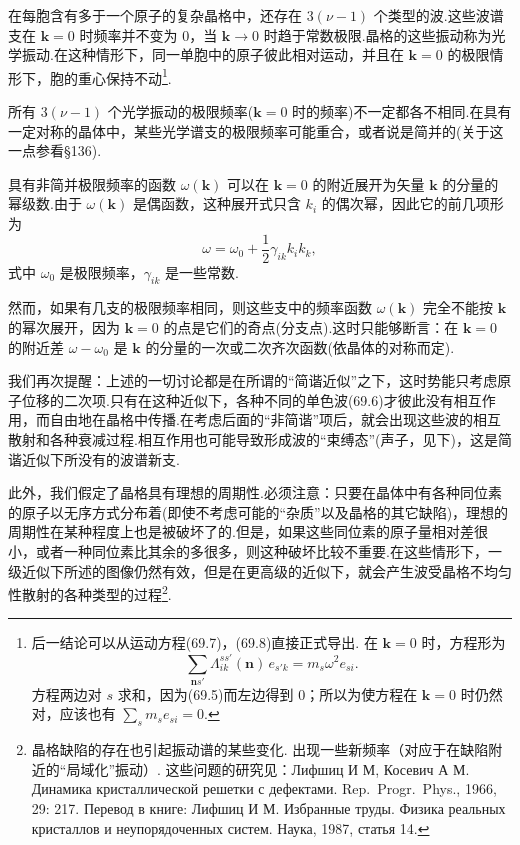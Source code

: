 在每胞含有多于一个原子的复杂晶格中，还存在 $3(\nu-1)$ 个类型的波.这些波谱支在 $\boldsymbol{k}=0$ 时频率并不变为 0，当 $\boldsymbol{k}\to0$ 时趋于常数极限.晶格的这些振动称为光学振动.在这种情形下，同一单胞中的原子彼此相对运动，并且在 $\boldsymbol{k}=0$ 的极限情形下，胞的重心保持不动\footnote{后一结论可以从运动方程(69.7)，(69.8)直接正式导出. 在 $\boldsymbol{k}=0$ 时，方程形为
\begin{equation*}
  \sum_{\boldsymbol{n}s'}\Lambda_{ik}^{ss'}(\boldsymbol{n})\,e_{s'k}=m_s\omega^2 e_{si}.
\end{equation*}
方程两边对 $s$ 求和，因为(69.5)而左边得到 0；所以为使方程在 $\boldsymbol{k}=0$ 时仍然对，应该也有 $\sum_s m_s e_{si}=0$.}.

所有 $3(\nu-1)$ 个光学振动的极限频率($\boldsymbol{k}=0$ 时的频率)不一定都各不相同.在具有一定对称的晶体中，某些光学谱支的极限频率可能重合，或者说是简并的(关于这一点参看§136).

具有非简并极限频率的函数 $\omega(\boldsymbol{k})$ 可以在 $\boldsymbol{k}=0$ 的附近展开为矢量 $\boldsymbol{k}$ 的分量的幂级数.由于 $\omega(\boldsymbol{k})$ 是偶函数，这种展开式只含 $k_i$ 的偶次幂，因此它的前几项形为
\begin{equation}
  \omega=\omega_0+\frac{1}{2}\gamma_{ik}k_ik_k,
\end{equation}
式中 $\omega_0$ 是极限频率，$\gamma_{ik}$ 是一些常数.

然而，如果有几支的极限频率相同，则这些支中的频率函数 $\omega(\boldsymbol{k})$ 完全不能按 $\boldsymbol{k}$ 的幂次展开，因为 $\boldsymbol{k}=0$ 的点是它们的奇点(分支点).这时只能够断言：在 $\boldsymbol{k}=0$ 的附近差 $\omega-\omega_0$ 是 $\boldsymbol{k}$ 的分量的一次或二次齐次函数(依晶体的对称而定).

我们再次提醒：上述的一切讨论都是在所谓的“简谐近似”之下，这时势能只考虑原子位移的二次项.只有在这种近似下，各种不同的单色波(69.6)才彼此没有相互作用，而自由地在晶格中传播.在考虑后面的“非简谐”项后，就会出现这些波的相互散射和各种衰减过程.相互作用也可能导致形成波的“束缚态”(声子，见下)，这是简谐近似下所没有的波谱新支.

此外，我们假定了晶格具有理想的周期性.必须注意：只要在晶体中有各种同位素的原子以无序方式分布着(即使不考虑可能的“杂质”以及晶格的其它缺陷)，理想的周期性在某种程度上也是被破坏了的.但是，如果这些同位素的原子量相对差很小，或者一种同位素比其余的多很多，则这种破坏比较不重要.在这些情形下，一级近似下所述的图像仍然有效，但是在更高级的近似下，就会产生波受晶格不均匀性散射的各种类型的过程\footnote{晶格缺陷的存在也引起振动谱的某些变化. 出现一些新频率（对应于在缺陷附近的“局域化”振动）. 这些问题的研究见：Лифшиц И М, Косевич А М. Динамика кристаллической решетки с дефектами. Rep.~Progr.~Phys., 1966, 29: 217. Перевод в книге: Лифшиц И М. Избранные труды. Физика реальных кристаллов и неупорядоченных систем. Наука, 1987, статья 14.}.


